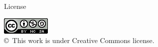 \documentclass[english,a4paper,14pt,oneside]{extreport}
\newenvironment{keywords}
{\begin{list}{}{\setlength{\leftmargin}{1em}}\item[\hskip\labelsep \bfseries Keywords:]}
{\end{list}}
\begin{document}
\begin{huge}
License
\end{huge}
\begin{center}
\includegraphics[scale=1.5]{images/by-nc-sa_88x31}\\[10mm]
{\Large \copyright~This work is under Creative Commons license.
}
\end{center}



\newpage  %

\newpage  %
\begin{abstract}
{\em



}

\begin{keywords}

\end{keywords}

\end{abstract}

\newpage{\pagestyle{empty}}
\thispagestyle{empty}



\pagestyle{myheadings} %

\renewcommand{\thepage}{\roman{page}}
\setcounter{page}{1}

\tableofcontents
\newpage{\pagestyle{empty}}
\listoffigures
\newpage{\pagestyle{empty}}
\listoftables
\newpage{\pagestyle{empty}}
\end{document}
